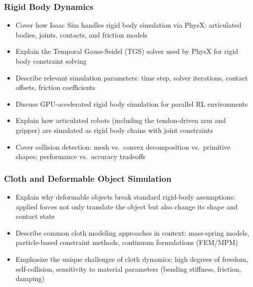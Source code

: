 \subsubsection{Rigid Body Dynamics}
\begin{itemize}
    \item Cover how Isaac Sim handles rigid body simulation via PhysX: articulated bodies, joints, contacts, and friction models
    \item Explain the Temporal Gauss-Seidel (TGS) solver used by PhysX for rigid body constraint solving
    \item Describe relevant simulation parameters: time step, solver iterations, contact offsets, friction coefficients
    \item Discuss GPU-accelerated rigid body simulation for parallel RL environments
    \item Explain how articulated robots (including the tendon-driven arm and gripper) are simulated as rigid body chains with joint constraints
    \item Cover collision detection: mesh vs.\ convex decomposition vs.\ primitive shapes; performance vs.\ accuracy tradeoffs
\end{itemize}

\subsubsection{Cloth and Deformable Object Simulation}
\begin{itemize}
    \item Explain why deformable objects break standard rigid-body assumptions: applied forces not only translate the object but also change its shape and contact state
    \item Describe common cloth modeling approaches in context: mass-spring models, particle-based constraint methods, continuum formulations (FEM/MPM)
    \item Emphasize the unique challenges of cloth dynamics: high degrees of freedom, self-collision, sensitivity to material parameters (bending stiffness, friction, damping)
\end{itemize}

